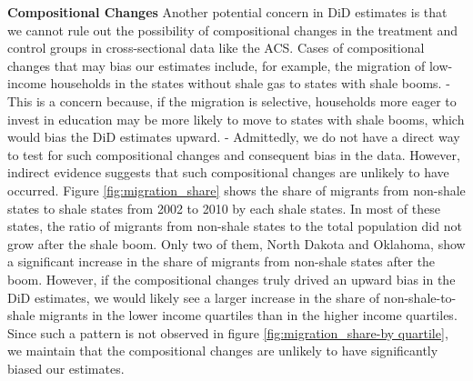 \textbf{Compositional Changes} \hspace{0.1cm}
Another potential concern in DiD estimates is that we cannot rule out the possibility of compositional changes in the treatment and control groups in cross-sectional data like the ACS.
Cases of compositional changes that may bias our estimates include, for example, the migration of low-income households in the states without shale gas to states with shale booms.
- This is a concern because, if the migration is selective, households more eager to invest in education may be more likely to move to states with shale booms, which would bias the DiD estimates upward.
- Admittedly, we do not have a direct way to test for such compositional changes and consequent bias in the data.
However, indirect evidence suggests that such compositional changes are unlikely to have occurred.
Figure \ref{fig:migration_share} shows the share of migrants from non-shale states to shale states from 2002 to 2010 by each shale states.
In most of these states, the ratio of migrants from non-shale states to the total population did not grow after the shale boom.
Only two of them, North Dakota and Oklahoma, show a significant increase in the share of migrants from non-shale states after the boom.
However, if the compositional changes truly drived an upward bias in the DiD estimates, we would likely see a larger increase in the share of non-shale-to-shale migrants in the lower income quartiles than in the higher income quartiles.
Since such a pattern is not observed in figure \ref{fig:migration_share-by quartile}, we maintain that the compositional changes are unlikely to have significantly biased our estimates.